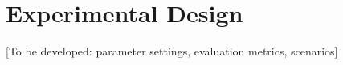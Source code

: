 \chapter{Experimental Design}
\label{chap:experiments}

[To be developed: parameter settings, evaluation metrics, scenarios]